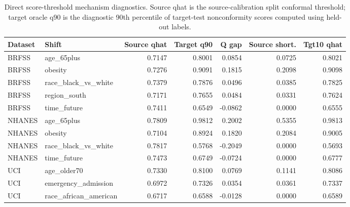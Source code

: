 \begin{table}[!tbp]
\centering
\caption{Direct score-threshold mechanism diagnostics. Source qhat is the source-calibration split conformal threshold; target oracle q90 is the diagnostic 90th percentile of target-test nonconformity scores computed using held-out labels.}
\label{tab:score_mechanism}
\scriptsize
\setlength{\tabcolsep}{3pt}
\begin{adjustbox}{max width=\textwidth}
\begin{tabular}{llrrrrr}
\toprule
Dataset & Shift & Source qhat & Target q90 & Q gap & Source short. & Tgt10 qhat \\
\midrule
BRFSS & age\_65plus & 0.7147 & 0.8001 & 0.0854 & 0.0725 & 0.8021 \\
BRFSS & obesity & 0.7276 & 0.9091 & 0.1815 & 0.2098 & 0.9098 \\
BRFSS & race\_black\_vs\_white & 0.7379 & 0.7876 & 0.0496 & 0.0385 & 0.7825 \\
BRFSS & region\_south & 0.7171 & 0.7655 & 0.0484 & 0.0331 & 0.7624 \\
BRFSS & time\_future & 0.7411 & 0.6549 & -0.0862 & 0.0000 & 0.6555 \\
NHANES & age\_65plus & 0.7809 & 0.9812 & 0.2002 & 0.5355 & 0.9813 \\
NHANES & obesity & 0.7104 & 0.8924 & 0.1820 & 0.2084 & 0.9005 \\
NHANES & race\_black\_vs\_white & 0.7817 & 0.5768 & -0.2049 & 0.0000 & 0.5693 \\
NHANES & time\_future & 0.7473 & 0.6749 & -0.0724 & 0.0000 & 0.6777 \\
UCI & age\_older70 & 0.7330 & 0.8100 & 0.0769 & 0.1141 & 0.8086 \\
UCI & emergency\_admission & 0.6972 & 0.7326 & 0.0354 & 0.0361 & 0.7337 \\
UCI & race\_african\_american & 0.6717 & 0.6588 & -0.0128 & 0.0000 & 0.6589 \\
\bottomrule
\end{tabular}
\end{adjustbox}
\end{table}
